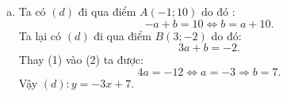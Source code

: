 \begin{ex}
{\begin{enumerate}[a)]
\begin{center}
			\end{center}
			\item 	Ta có $(d)$ đi qua điểm $A(-1;10)$  do đó :
			\begin{equation}
			-a+b=10 \Leftrightarrow b=a+10.
			\end{equation}
			Ta lại có $(d)$ đi qua điểm $B(3;-2)$ do đó:
			\begin{equation}
			3a+b=-2.
			\end{equation}
			Thay (1) vào (2) ta được: $$4a=-12 \Leftrightarrow a=-3 \Rightarrow b=7.$$
			Vậy $(d): y=-3x+7$.
		\end{enumerate}
		
	}
\end{ex}


